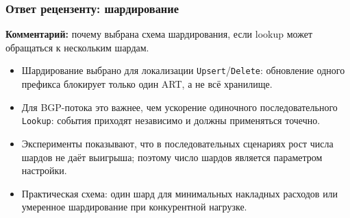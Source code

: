 \begin{frame}\frametitle{Ответ рецензенту: шардирование}
\footnotesize
\textbf{Комментарий:} почему выбрана схема шардирования, если lookup может
обращаться к нескольким шардам.

\vspace{0.3em}
\begin{itemize}\setlength{\itemsep}{0.35em}
  \item Шардирование выбрано для локализации \texttt{Upsert}/\texttt{Delete}:
  обновление одного префикса блокирует только один ART, а не всё хранилище.
  \item Для BGP-потока это важнее, чем ускорение одиночного последовательного
  \texttt{Lookup}: события приходят независимо и должны применяться точечно.
  \item Эксперименты показывают, что в последовательных сценариях рост числа
  шардов не даёт выигрыша; поэтому число шардов является параметром настройки.
  \item Практическая схема: один шард для минимальных накладных расходов или
  умеренное шардирование при конкурентной нагрузке.
\end{itemize}
\end{frame}
